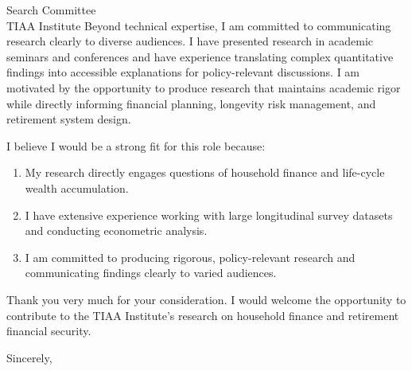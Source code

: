 \documentclass[11pt,letterpaper]{letter}
\begin{document}
\begin{letter}{
Search Committee \\
TIAA Institute
}
Beyond technical expertise, I am committed to communicating research clearly to diverse audiences. I have presented research in academic seminars and conferences and have experience translating complex quantitative findings into accessible explanations for policy-relevant discussions. I am motivated by the opportunity to produce research that maintains academic rigor while directly informing financial planning, longevity risk management, and retirement system design.

I believe I would be a strong fit for this role because:
\begin{enumerate}
    \item My research directly engages questions of household finance and life-cycle wealth accumulation.
    \item I have extensive experience working with large longitudinal survey datasets and conducting econometric analysis.
    \item I am committed to producing rigorous, policy-relevant research and communicating findings clearly to varied audiences.
\end{enumerate}

Thank you very much for your consideration. I would welcome the opportunity to contribute to the TIAA Institute’s research on household finance and retirement financial security.

\closing{Sincerely,}

\end{letter}
\end{document}
